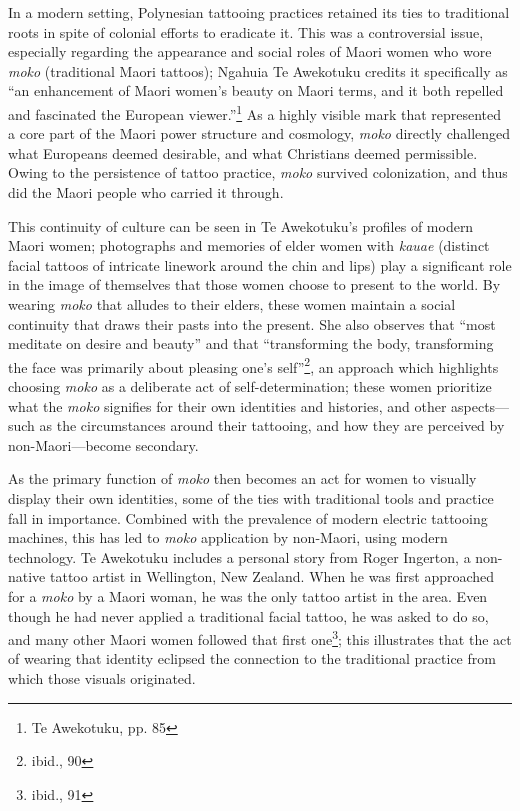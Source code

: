 In a modern setting, Polynesian tattooing practices retained its ties to
traditional roots in spite of colonial efforts to eradicate it. This was a
controversial issue, especially regarding the appearance and social roles of
Maori women who wore \textit{moko} (traditional Maori tattoos); Ngahuia Te
Awekotuku credits it specifically as ``an enhancement of Maori women's beauty on
Maori terms, and it both repelled and fascinated the European
viewer.''\footnote{Te Awekotuku, pp. 85} As a highly visible mark that
represented a core part of the Maori power structure and cosmology,
\textit{moko} directly challenged what Europeans deemed desirable, and what
Christians deemed permissible. Owing to the persistence of tattoo practice,
\textit{moko} survived colonization, and thus did the Maori people who carried
it through.

This continuity of culture can be seen in Te Awekotuku's profiles of modern
Maori women; photographs and memories of elder women with \textit{kauae}
(distinct facial tattoos of intricate linework around the chin and lips) play a
significant role in the image of themselves that those women choose to present
to the world. By wearing \textit{moko} that alludes to their elders, these women
maintain a social continuity that draws their pasts into the present. She also
observes that ``most meditate on desire and beauty'' and that ``transforming the
body, transforming the face was primarily about pleasing one's
self''\footnote{ibid., 90}, an approach which highlights choosing \textit{moko}
as a deliberate act of self-determination; these women prioritize what the
\textit{moko} signifies for their own identities and histories, and other
aspects---such as the circumstances around their tattooing, and how they are
perceived by non-Maori---become secondary.

As the primary function of \textit{moko} then  becomes an act for women to
visually display their own identities, some of the ties with traditional tools
and practice fall in importance. Combined with the prevalence of modern electric
tattooing machines, this has led to \textit{moko} application by non-Maori,
using modern technology. Te Awekotuku includes a personal story from Roger
Ingerton, a non-native tattoo artist in Wellington, New Zealand. When he was
first approached for a \textit{moko} by a Maori woman, he was the only tattoo
artist in the area. Even though he had never applied a traditional facial
tattoo, he was asked to do so, and many other Maori women followed that first
one\footnote{ibid., 91}; this illustrates that the act of wearing that identity
eclipsed the connection to the traditional practice from which those visuals
originated.

